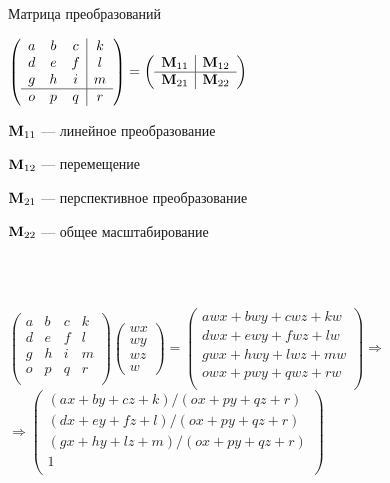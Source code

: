 \documentclass[10pt]{beamer}
\begin{document}
	\begin{frame}{Матрица преобразований}
		
		{
			$   \left(
			\begin{array}{ccc|c}
				a & b & c & k \\
				d & e & f & l \\
				g & h & i & m \\ \hline
				o & p & q & r \\				
			\end{array}
			\right) = 
			\left(
			\begin{array}{c|c}
				\textbf M_{11} & \textbf M_{12} \\ \hline
                \textbf M_{21} & \textbf M_{22}						
			\end{array}
			\right)
			$
		}
		{
			$\textbf M_{11}$  --- линейное преобразование \footnotemark 
				
			$\textbf M_{12}$ --- перемещение 
			
			$\textbf M_{21}$ --- перспективное преобразование
			
			$\textbf M_{22}$ --- общее масштабирование
		} 
		
		
		\hfil \\ ~ \\

		\pause
		
		$
		\left(
		\begin{array}{cccc}
			a & b & c & k \\
			d & e & f & l \\
			g & h & i & m \\ 
			o & p & q & r \\				
		\end{array}
		\right)
		\begin{pmatrix}
			wx\\wy\\wz\\w
		\end{pmatrix}
		=
		\begin{pmatrix}
			awx+bwy+cwz+kw\\
			dwx+ewy+fwz+lw\\
			gwx+hwy+lwz+mw\\
			owx+pwy+qwz+rw\\
		\end{pmatrix}
	   \Rightarrow
		$\\
		$
		\Rightarrow
		\begin{pmatrix}
			(ax+by+cz+k)/(ox+py+qz+r)\\
			(dx+ey+fz+l)/(ox+py+qz+r)\\
			(gx+hy+lz+m)/(ox+py+qz+r)\\
			1\\
		\end{pmatrix}
		$
		
		 
	\end{frame}
	
\end{document}

